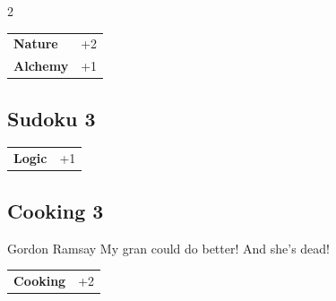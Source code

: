 \begin{multicols}{2}
\begin{tcolorbox}
\begin{tabular}{@{}ll@{}}
    \textbf{Nature} & +2\\
    \textbf{Alchemy} & +1\\
\end{tabular}


\end{tcolorbox}

\begin{tcolorbox}
    \subsection*{Sudoku \hfill \small{3 }}
    \tcblower




\begin{tabular}{@{}ll@{}}
    \textbf{Logic} & +1\\
\end{tabular}


\end{tcolorbox}

\begin{tcolorbox}
    \subsection*{Cooking \hfill \small{3 }}
    \tcblower


\begin{pquote}{Gordon Ramsay}
My gran could do better! And she’s dead!
\end{pquote}

\vspace{3mm}

\begin{tabular}{@{}ll@{}}
    \textbf{Cooking} & +2\\
\end{tabular}



\end{tcolorbox}
\end{multicols}
